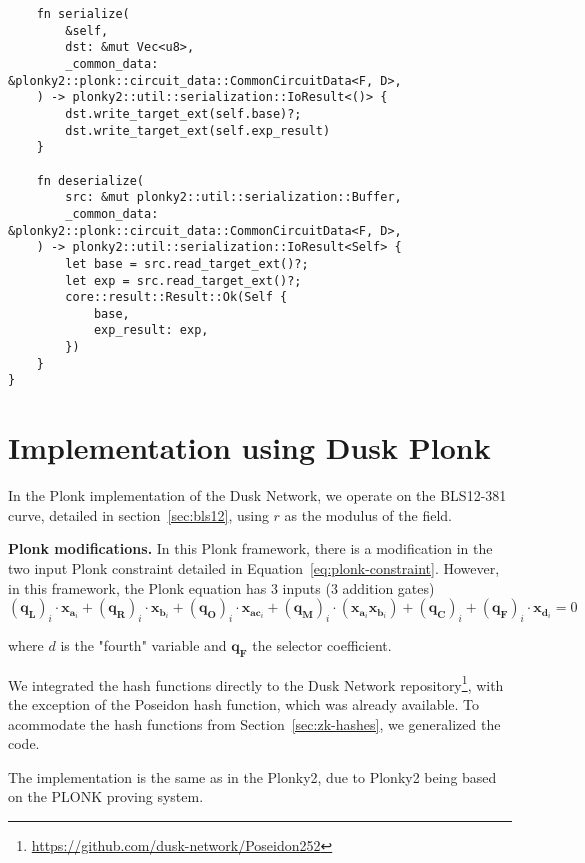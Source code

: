 \begin{lstlisting}
    fn serialize(
        &self,
        dst: &mut Vec<u8>,
        _common_data: &plonky2::plonk::circuit_data::CommonCircuitData<F, D>,
    ) -> plonky2::util::serialization::IoResult<()> {
        dst.write_target_ext(self.base)?;
        dst.write_target_ext(self.exp_result)
    }

    fn deserialize(
        src: &mut plonky2::util::serialization::Buffer,
        _common_data: &plonky2::plonk::circuit_data::CommonCircuitData<F, D>,
    ) -> plonky2::util::serialization::IoResult<Self> {
        let base = src.read_target_ext()?;
        let exp = src.read_target_ext()?;
        core::result::Result::Ok(Self {
            base,
            exp_result: exp,
        })
    }
}
\end{lstlisting}


\section{Implementation using Dusk Plonk}
In the Plonk implementation of the Dusk Network, we operate on the BLS12-381 curve, detailed in section~\ref{sec:bls12}, using $r$ as the modulus of the field.

\textbf{Plonk modifications.} In this Plonk framework, there is a modification in the two input Plonk constraint detailed in Equation~\ref{eq:plonk-constraint}. However, in this framework, the Plonk equation has 3 inputs (3 addition gates)
\begin{equation}
  \left(\textbf{q}_\textbf{L}\right)_i\cdot\textbf{x}_{\textbf{a}_i}+ \left(\textbf{q}_\textbf{R}\right)_i\cdot\textbf{x}_{\textbf{b}_i} + \left(\textbf{q}_\textbf{O}\right)_i\cdot\textbf{x}_{\textbf{ac}_i} + \left(\textbf{q}_\textbf{M}\right)_i\cdot\left(\textbf{x}_{\textbf{a}_i}\textbf{x}_{\textbf{b}_i}\right) + \left(\textbf{q}_\textbf{C}\right)_i + \left(\textbf{q}_\textbf{F}\right)_i\cdot\textbf{x}_{\textbf{d}_i}=0
\end{equation}

where $d$ is the "fourth" variable and $\textbf{q}_\textbf{F}$ the selector coefficient.

We integrated the hash functions directly to the Dusk Network repository\footnote{\url{https://github.com/dusk-network/Poseidon252}}, with the exception of the Poseidon hash function, which was already available. To acommodate the hash functions from Section~\ref{sec:zk-hashes}, we generalized the code.

The implementation is the same as in the Plonky2, due to Plonky2 being based on the PLONK proving system.

